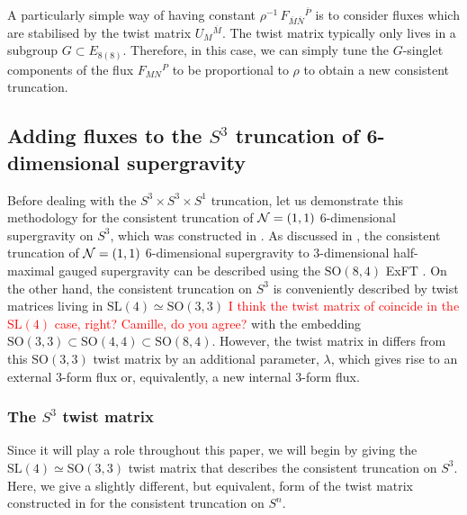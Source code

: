 \documentclass[a4paper, 11pt]{article}
\numberwithin{equation}{section}
\newcommand{\ov}[1]{\overline{#1}}
\newcommand{\SL}[1]{\mathrm{SL}( #1 )}
\newcommand{\SO}[1]{\mathrm{SO}( #1 )}
\newcommand{\EE}{\ensuremath{E_{8(8)}}\xspace}
\newcommand{\+}{\oplus}
\newcommand{\fl}[1]{\ov{#1}}
\newcommand{\EM}[1]{\textcolor{red}{#1}}
\begin{document}
A particularly simple way of having constant $\rho^{-1}\, F_{\fl{M}\fl{N}}{}^{\fl{P}}$ is to consider fluxes which are stabilised by the twist matrix $U_M{}^{\fl{M}}$. The twist matrix typically only lives in a subgroup $G \subset \EE$. Therefore, in this case, we can simply tune the $G$-singlet components of the flux $F_{MN}{}^P$ to be proportional to $\rho$ to obtain a new consistent truncation.

\subsection{Adding fluxes to the $S^3$ truncation of 6-dimensional supergravity} \label{s:S3Flux}
Before dealing with the $S^3 \times S^3 \times S^1$ truncation, let us demonstrate this methodology for the consistent truncation of ${\cal N}=(1,1)$ 6-dimensional supergravity on $S^3$, which was constructed in \cite{Eloy:2021fhc}. As discussed in \cite{Eloy:2021fhc}, the consistent truncation of ${\cal N}=(1,1)$ 6-dimensional supergravity to 3-dimensional half-maximal gauged supergravity can be described using the $\SO{8,4}$ ExFT \cite{Hohm:2017wtr,Samtleben:2019zrh}. On the other hand, the consistent truncation on $S^3$ is conveniently described by twist matrices living in $\SL{4} \simeq \SO{3,3}$ \cite{Lee:2014mla,Hohm:2014qga,Baguet:2015iou} \EM{I think the twist matrix of \cite{Baguet:2015iou,Lee:2014mla,Hohm:2014qga} coincide in the $\SL{4}$ case, right? Camille, do you agree?} with the embedding $\SO{3,3} \subset \SO{4,4} \subset \SO{8,4}$. However, the twist matrix in \cite{Eloy:2021fhc} differs from this $\SO{3,3}$ twist matrix \cite{Lee:2014mla,Hohm:2014qga,Baguet:2015iou} by an additional parameter, $\lambda$, which gives rise to an external 3-form flux or, equivalently, a new internal 3-form flux.

\subsubsection{The $S^3$ twist matrix}
Since it will play a role throughout this paper, we will begin by giving the $\SL{4} \simeq \SO{3,3}$ twist matrix that describes the consistent truncation on $S^3$. Here, we give a slightly different, but equivalent, form of the twist matrix constructed in \cite{Lee:2014mla,Hohm:2014qga,Baguet:2015iou} for the consistent truncation on $S^n$.
\end{document}
